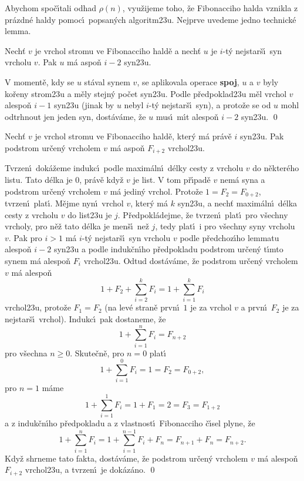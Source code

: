 \flushpar Abychom spo\v c\'\i tali odhad $\rho (n)$, vyu\v zijeme toho, \v ze 
Fibonacciho halda vznikla z pr\'azdn\'e haldy pomoc\'\i\ 
popsan\'ych algoritm\accent23u. Nejprve uvedeme jedno technick\'e 
lemma.
\medskip

Nech\v t $v$ je vrchol stromu ve 
Fibonacciho hald\v e a nech\v t $u$ je $i$-t\'y nejstar\v s\'\i\ syn 
vrcholu $v$. Pak $u$ m\'a aspo\v n $i-2$ syn\accent23u.
\endproclaim

V moment\v e, kdy se $u$ st\'aval synem $v$, se 
aplikovala operace {\bf spoj}, $u$ a $v$ byly ko\v reny 
strom\accent23u a m\v ely stejn\'y po\v cet syn\accent23u. 
Podle p\v redpoklad\accent23u m\v el vrchol $v$ alespo\v n $i-1$ 
syn\accent23u (jinak by $u$ nebyl $i$-t\'y nejstar\v s\'\i\ syn), a 
proto\v ze se od $u$ mohl odtrhnout jen jeden syn, 
dost\'av\'ame, \v ze $u$ mus\'\i\ m\'\i t alespo\v n $i-2$ syn\accent23u. \qed
\enddemo
\medskip

Nech\v t $v$ je vrchol stromu ve 
Fibonacciho hald\v e, kte\-r\'y m\'a pr\'av\v e $i$ syn\accent23u. Pak 
podstrom ur\v cen\'y vrcholem $v$ m\'a aspo\v n $F_{i+2}$ 
vrchol\accent23u.
\endproclaim

Tvrzen\'\i\ dok\'a\v zeme indukc\'\i\ 
podle maxim\'aln\'\i\ d\'elky cesty z vrcholu $v$ do n\v ekter\'eho 
listu.  Tato d\'elka je $0$, pr\'av\v e kdy\v z $v$ je list.  V tom 
p\v r\'\i pad\v e $v$ nem\'a syna a podstrom ur\v cen\'y vrcholem $
v$ m\'a 
jedin\'y vrchol.  Proto\v ze $1=F_2=F_{0+2}$, tvrzen\'\i\ plat\'\i .  
M\v ejme nyn\'\i\ vrchol $v$, kter\'y m\'a $k$ 
syn\accent23u, a nech\v t maxim\'aln\'\i\ d\'elka cesty z vrcholu $
v$ do 
list\accent23u je $j$. P\v redpokl\'adej\-me, \v ze tvrzen\'\i\ plat\'\i\ pro 
v\v sechny vrcholy, pro n\v e\v z tato d\'elka  
je men\v s\'\i\ ne\v z $j$,  tedy plat\'\i\ i pro 
v\v sechny syny vrcholu $v$.  Pak pro $i>1$ m\'a $i$-t\'y nejstar\v s\'\i\ 
syn vrcholu $v$ podle p\v redchoz\'\i ho lemmatu alespo\v n $i-2$ 
syn\accent23u a podle induk\v cn\'\i ho p\v redpokladu podstrom ur\v cen\'y 
t\'\i mto synem m\'a alespo\v n $F_i$ vrchol\accent23u.  Odtud 
dost\'av\'ame, \v ze podstrom ur\v cen\'y vrcholem $v$ m\'a alespo\v n 
$$1+F_2+\sum_{i=2}^kF_i=1+\sum_{i=1}^kF_i$$
vrchol\accent23u, proto\v ze $F_1=F_2$ (na lev\'e stran\v e prvn\'\i\ $
1$ 
je za vrchol $v$ a 
prvn\'\i\ $F_2$ je za nejstar\v s\'\i\ vrchol). Indukc\'\i\ pak dostaneme, \v ze 
$$1+\sum_{i=1}^nF_i=F_{n+2}$$
pro v\v sechna $n\ge 0$. Skute\v cn\v e, pro $n=0$ plat\'\i\ 
$$1+\sum_{i=1}^0F_i=1=F_2=F_{0+2},$$
pro $n=1$ m\'ame 
$$1+\sum_{i=1}^1F_i=1+F_1=2=F_3=F_{1+2}$$
a z induk\v cn\'\i ho p\v redpokladu a z vlastnost\'\i\ Fibonacciho 
\v c\'\i sel plyne, \v ze 
$$1+\sum_{i=1}^nF_i=1+\sum_{i=1}^{n-1}F_i+F_n=F_{n+1}+F_n=F_{n+2}
.$$
Kdy\v z shrneme tato fakta, dost\'av\'ame, \v ze podstrom 
ur\v cen\'y vrcholem $v$ m\'a alespo\v n $F_{i+2}$ vrchol\accent23u, a 
tvrzen\'\i\ je dok\'az\'ano. \qed
\enddemo
\medskip

